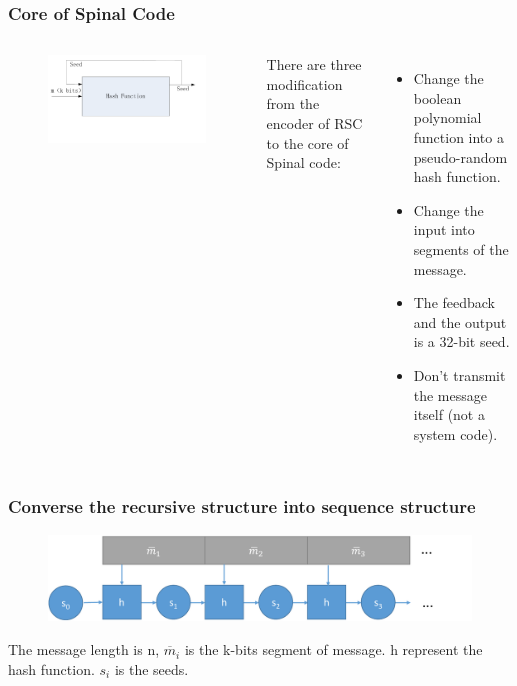 \documentclass{beamer}
\begin{document}
\begin{frame}
\frametitle{Core of Spinal Code}
\begin{columns}
\begin{figure}
\includegraphics[width=.99\textwidth]{Spinalcode1.pdf}
\end{figure}
There are three modification from the encoder of RSC to the core of Spinal code:
\begin{itemize}
\item  Change the boolean polynomial function into a pseudo-random hash function.
\item Change the input into segments of the message.
\item The feedback and the output is a 32-bit seed.
\item Don't transmit the message itself (not a system code).
\end{itemize}
\end{columns}
\end{frame}
\begin{frame}
\frametitle{Converse the recursive structure into sequence structure}
\begin{figure}
\includegraphics[width=.99\textwidth]{Spinalcode2.pdf}
\end{figure}
The message length is n, $\overline{m}_i$ is the k-bits segment of message. h represent the hash function. $s_i$ is the seeds. 
\end{frame}
\end{document}
